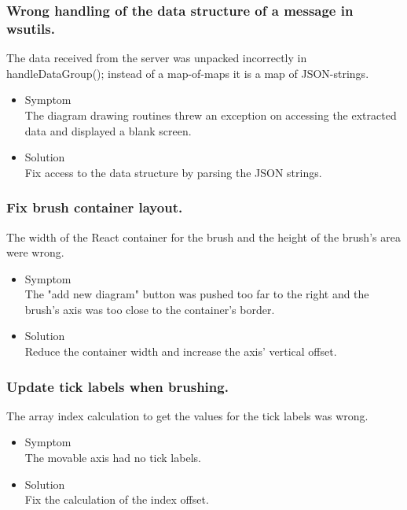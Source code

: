 \documentclass[oneside, english, final]{design}
\begin{document}
\subsubsection{Wrong handling of the data structure of a message in wsutils.}

The data received from the server was unpacked incorrectly in handleDataGroup(); instead of a map-of-maps it is a map of JSON-strings.

\begin{itemize}
      \item{Symptom
            \\
            The diagram drawing routines threw an exception on accessing the extracted data and displayed a blank screen.
	}
      \item{Solution
            \\
            Fix access to the data structure by parsing the JSON strings.
            }
\end{itemize}

\subsubsection{Fix brush container layout.}

The width of the React container for the brush and the height of the brush's area were wrong.

\begin{itemize}
      \item{Symptom
            \\
            The "add new diagram" button was pushed too far to the right and the brush's axis was too close to the container's border.
	}
      \item{Solution
            \\
            Reduce the container width and increase the axis' vertical offset.
            }
\end{itemize}


\subsubsection{Update tick labels when brushing.}

The array index calculation to get the values for the tick labels was wrong.

\begin{itemize}
      \item{Symptom
            \\
            The movable axis had no tick labels.
	}
      \item{Solution
            \\
            Fix the calculation of the index offset.
            }
\end{itemize}
\end{document}
